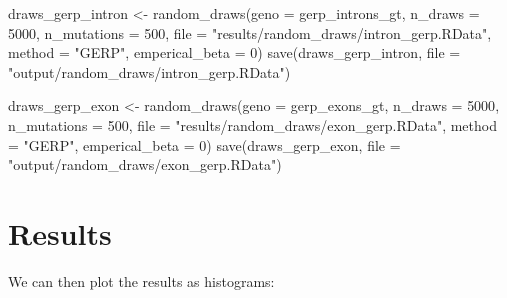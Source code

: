 \documentclass[
  letterpaper,
  DIV=11,
  numbers=noendperiod]{scrreprt}
\newenvironment{Shaded}{}{}
\newcommand{\AttributeTok}[1]{\textcolor[rgb]{0.84,0.23,0.29}{#1}}
\newcommand{\DecValTok}[1]{\textcolor[rgb]{0.00,0.36,0.77}{#1}}
\newcommand{\FunctionTok}[1]{\textcolor[rgb]{0.44,0.26,0.76}{#1}}
\newcommand{\NormalTok}[1]{\textcolor[rgb]{0.14,0.16,0.18}{#1}}
\newcommand{\OtherTok}[1]{\textcolor[rgb]{0.44,0.26,0.76}{#1}}
\newcommand{\StringTok}[1]{\textcolor[rgb]{0.01,0.18,0.38}{#1}}
\begin{document}
\begin{Shaded}
\begin{Highlighting}[]
\NormalTok{draws\_gerp\_intron }\OtherTok{\textless{}{-}} \FunctionTok{random\_draws}\NormalTok{(}\AttributeTok{geno =}\NormalTok{ gerp\_introns\_gt, }\AttributeTok{n\_draws =} \DecValTok{5000}\NormalTok{, }\AttributeTok{n\_mutations =} \DecValTok{500}\NormalTok{, }\AttributeTok{file =} \StringTok{"results/random\_draws/intron\_gerp.RData"}\NormalTok{, }\AttributeTok{method =} \StringTok{"GERP"}\NormalTok{, }\AttributeTok{emperical\_beta =} \DecValTok{0}\NormalTok{)}
\FunctionTok{save}\NormalTok{(draws\_gerp\_intron, }\AttributeTok{file =} \StringTok{"output/random\_draws/intron\_gerp.RData"}\NormalTok{)}

\NormalTok{draws\_gerp\_exon }\OtherTok{\textless{}{-}} \FunctionTok{random\_draws}\NormalTok{(}\AttributeTok{geno =}\NormalTok{ gerp\_exons\_gt, }\AttributeTok{n\_draws =} \DecValTok{5000}\NormalTok{, }\AttributeTok{n\_mutations =} \DecValTok{500}\NormalTok{, }\AttributeTok{file =} \StringTok{"results/random\_draws/exon\_gerp.RData"}\NormalTok{, }\AttributeTok{method =} \StringTok{"GERP"}\NormalTok{, }\AttributeTok{emperical\_beta =} \DecValTok{0}\NormalTok{)}
\FunctionTok{save}\NormalTok{(draws\_gerp\_exon, }\AttributeTok{file =} \StringTok{"output/random\_draws/exon\_gerp.RData"}\NormalTok{)}
\end{Highlighting}
\end{Shaded}

\hypertarget{results-4}{%
\section{Results}\label{results-4}}

We can then plot the results as histograms:
\end{document}
